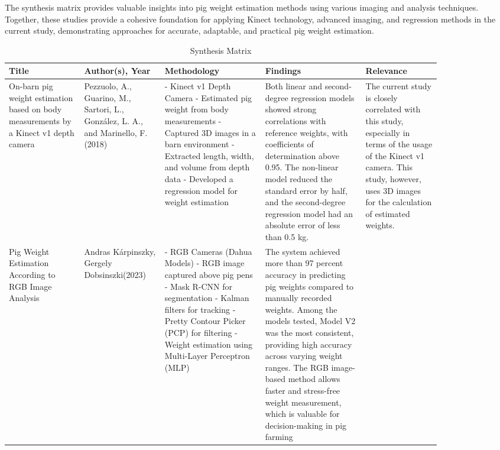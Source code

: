 {The synthesis matrix provides valuable insights into pig weight estimation methods using various imaging and analysis techniques. Together, these studies provide a cohesive foundation for applying Kinect technology, advanced imaging, and regression methods in the current study, demonstrating approaches for accurate, adaptable, and practical pig weight estimation.
\newpage
\begin{longtable}{|p{0.15\linewidth} | p{0.15\linewidth} | p{0.2\linewidth} | p{0.2\linewidth} | p{0.15\linewidth}|}
	\caption{Synthesis Matrix}
	\label{tab:synthesis matrix}\\
	\hline
	\textbf{Title} & \textbf{Author(s), Year} & \textbf{Methodology} & \textbf{Findings} & \textbf{Relevance} \\
	\hline
	On-barn pig weight estimation based on body measurements by a Kinect v1 depth camera
	& 
	Pezzuolo, A., Guarino, M., Sartori, L., González, L. A., and Marinello, F. (2018) 
	&
	- Kinect v1 Depth Camera\newline
	- Estimated pig weight from body measurements\newline
	- Captured 3D images in a barn environment\newline
	- Extracted length, width, and volume from depth data\newline
	- Developed a regression model for weight estimation
	& 
	Both linear and second-degree regression models showed strong correlations with reference weights, with coefficients of determination above 0.95. The non-linear model reduced the standard error by half, and the second-degree regression model had an absolute error of less than 0.5 kg.
	&
	The current study is closely correlated with this study, especially in terms of the usage of the Kinect v1 camera. This study, however, uses 3D images for the calculation of estimated weights.
	\\
	\hline
	Pig Weight Estimation According to RGB Image Analysis
	& 
	Andras Kárpinszky, Gergely Dobsinszki(2023)
	&
	- RGB Cameras (Dahua Models)\newline
	- RGB image captured above pig pens\newline
	- Mask R-CNN for segmentation\newline
	- Kalman filters for tracking\newline
	- Pretty Contour Picker (PCP) for filtering\newline
	- Weight estimation using Multi-Layer Perceptron (MLP)
	& 
	The system achieved more than 97 percent accuracy in predicting pig weights compared to manually recorded weights. Among the models tested, Model V2 was the most consistent, providing high accuracy across varying weight ranges. The RGB image-based method allows faster and stress-free weight measurement, which is valuable for decision-making in pig farming

\end{longtable}}
